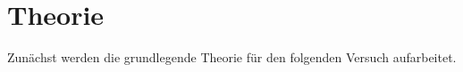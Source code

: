 \section{Theorie}
\label{sec:Theorie}

Zunächst werden die grundlegende Theorie für den folgenden Versuch aufarbeitet.